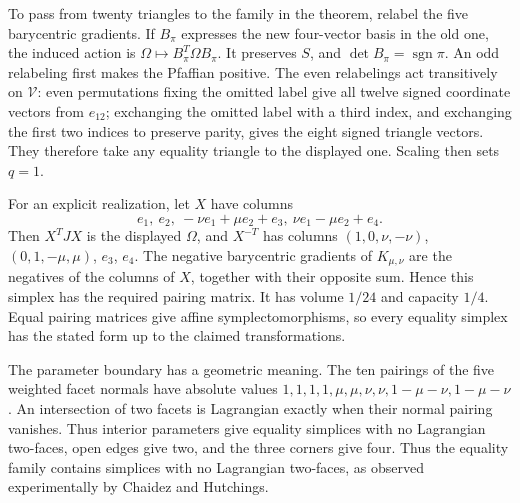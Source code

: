 To pass from twenty triangles to the family in the theorem, relabel the
five barycentric gradients. If $B_\pi$ expresses the new four-vector basis
in the old one, the induced action is
$\Omega\mapsto B_\pi^T\Omega B_\pi$. It preserves $S$, and
$\det B_\pi=\operatorname{sgn}\pi$. An odd relabeling first makes the
Pfaffian positive. The even relabelings act transitively on $\mathcal V$:
even permutations fixing the omitted label give all twelve signed
coordinate vectors from $e_{12}$; exchanging the omitted label with a
third index, and exchanging the first two indices to preserve parity,
gives the eight signed triangle vectors. They therefore take any
equality triangle to the displayed one. Scaling then sets $q=1$.

For an explicit realization, let $X$ have columns
\[
 e_1,\ e_2,\ -\nu e_1+\mu e_2+e_3,\
 \nu e_1-\mu e_2+e_4.
\]
Then $X^T JX$ is the displayed $\Omega$, and $X^{-T}$ has columns
$(1,0,\nu,-\nu)$, $(0,1,-\mu,\mu)$, $e_3$, $e_4$.
The negative barycentric gradients of $K_{\mu,\nu}$ are the negatives
of the columns of $X$, together with their opposite sum. Hence this
simplex has the required pairing matrix. It has volume $1/24$ and
capacity $1/4$. Equal pairing matrices give affine symplectomorphisms,
so every equality simplex has the stated form up to the claimed
transformations.

The parameter boundary has a geometric meaning. The ten pairings of the
five weighted facet normals have absolute values
$1,1,1,1,\mu,\mu,\nu,\nu,1-\mu-\nu,1-\mu-\nu$.
An intersection of two facets is Lagrangian exactly when their normal
pairing vanishes. Thus interior parameters give equality simplices with
no Lagrangian two-faces, open edges give two, and the three corners give
four. Thus the equality family contains simplices with no Lagrangian
two-faces, as observed experimentally by Chaidez and Hutchings.
